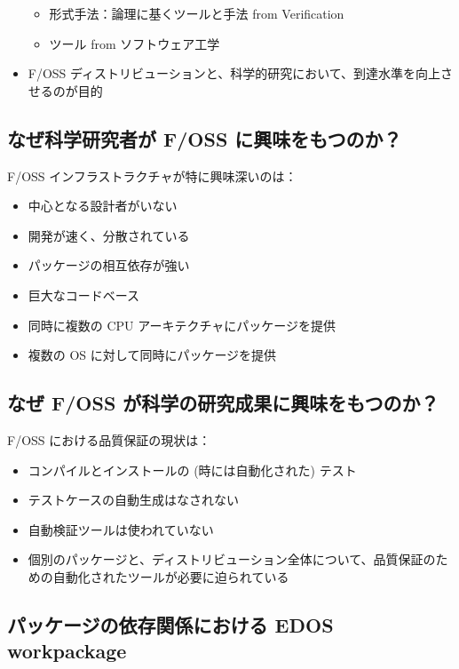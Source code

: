 \documentclass[mingoth,a4paper]{jsarticle}
\begin{document}
\begin{commandline}
\begin{itemize}
\begin{itemize}
\item 形式手法：論理に基くツールと手法 from Verification
\item ツール from ソフトウェア工学
\end{itemize}
\item F/OSS ディストリビューションと、科学的研究において、到達水準を向上させるのが目的
\end{itemize}


\subsection{なぜ科学研究者が F/OSS に興味をもつのか？}

F/OSS インフラストラクチャが特に興味深いのは：

\begin{itemize}
\item 中心となる設計者がいない
\item 開発が速く、分散されている
\item パッケージの相互依存が強い
\item 巨大なコードベース
\item 同時に複数の CPU アーキテクチャにパッケージを提供
\item 複数の OS に対して同時にパッケージを提供
\end{itemize}


\subsection{なぜ F/OSS が科学の研究成果に興味をもつのか？}

F/OSS における品質保証の現状は：

\begin{itemize}
\item コンパイルとインストールの (時には自動化された) テスト
\item テストケースの自動生成はなされない
\item 自動検証ツールは使われていない
\item 個別のパッケージと、ディストリビューション全体について、品質保証のための自動化されたツールが必要に迫られている
\end{itemize}


\subsection{パッケージの依存関係における EDOS workpackage}


\end{commandline}
\end{document}
